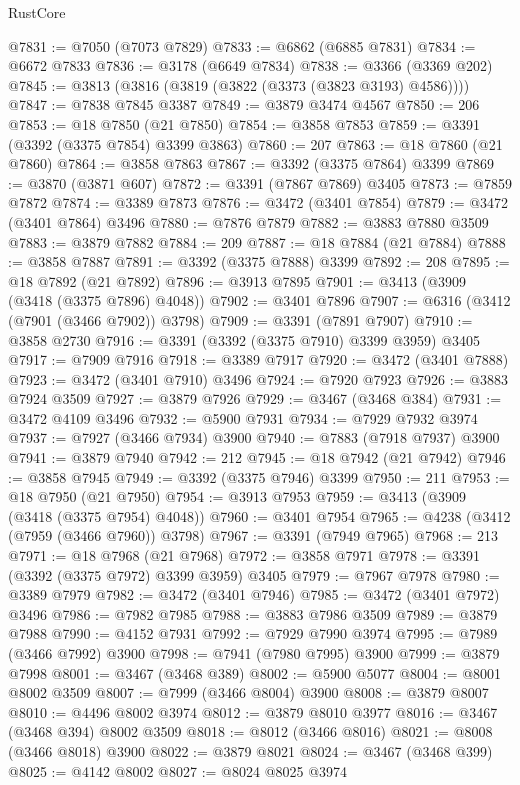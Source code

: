 \begin{lexlean}{RustCore}
\begin{coremodule}
@7831 := @7050 (@7073 @7829)
@7833 := @6862 (@6885 @7831)
@7834 := @6672 @7833
@7836 := @3178 (@6649 @7834)
@7838 := @3366 (@3369 @202)
@7845 := @3813 (@3816 (@3819 (@3822 (@3373 (@3823 @3193) @4586))))
@7847 := @7838 @7845 @3387
@7849 := @3879 @3474 @4567
@7850 := 206
@7853 := @18 @7850 (@21 @7850)
@7854 := @3858 @7853
@7859 := @3391 (@3392 (@3375 @7854) @3399 @3863)
@7860 := 207
@7863 := @18 @7860 (@21 @7860)
@7864 := @3858 @7863
@7867 := @3392 (@3375 @7864) @3399
@7869 := @3870 (@3871 @607)
@7872 := @3391 (@7867 @7869) @3405
@7873 := @7859 @7872
@7874 := @3389 @7873
@7876 := @3472 (@3401 @7854)
@7879 := @3472 (@3401 @7864) @3496
@7880 := @7876 @7879
@7882 := @3883 @7880 @3509
@7883 := @3879 @7882
@7884 := 209
@7887 := @18 @7884 (@21 @7884)
@7888 := @3858 @7887
@7891 := @3392 (@3375 @7888) @3399
@7892 := 208
@7895 := @18 @7892 (@21 @7892)
@7896 := @3913 @7895
@7901 := @3413 (@3909 (@3418 (@3375 @7896) @4048))
@7902 := @3401 @7896
@7907 := @6316 (@3412 (@7901 (@3466 @7902)) @3798)
@7909 := @3391 (@7891 @7907)
@7910 := @3858 @2730
@7916 := @3391 (@3392 (@3375 @7910) @3399 @3959) @3405
@7917 := @7909 @7916
@7918 := @3389 @7917
@7920 := @3472 (@3401 @7888)
@7923 := @3472 (@3401 @7910) @3496
@7924 := @7920 @7923
@7926 := @3883 @7924 @3509
@7927 := @3879 @7926
@7929 := @3467 (@3468 @384)
@7931 := @3472 @4109 @3496
@7932 := @5900 @7931
@7934 := @7929 @7932 @3974
@7937 := @7927 (@3466 @7934) @3900
@7940 := @7883 (@7918 @7937) @3900
@7941 := @3879 @7940
@7942 := 212
@7945 := @18 @7942 (@21 @7942)
@7946 := @3858 @7945
@7949 := @3392 (@3375 @7946) @3399
@7950 := 211
@7953 := @18 @7950 (@21 @7950)
@7954 := @3913 @7953
@7959 := @3413 (@3909 (@3418 (@3375 @7954) @4048))
@7960 := @3401 @7954
@7965 := @4238 (@3412 (@7959 (@3466 @7960)) @3798)
@7967 := @3391 (@7949 @7965)
@7968 := 213
@7971 := @18 @7968 (@21 @7968)
@7972 := @3858 @7971
@7978 := @3391 (@3392 (@3375 @7972) @3399 @3959) @3405
@7979 := @7967 @7978
@7980 := @3389 @7979
@7982 := @3472 (@3401 @7946)
@7985 := @3472 (@3401 @7972) @3496
@7986 := @7982 @7985
@7988 := @3883 @7986 @3509
@7989 := @3879 @7988
@7990 := @4152 @7931
@7992 := @7929 @7990 @3974
@7995 := @7989 (@3466 @7992) @3900
@7998 := @7941 (@7980 @7995) @3900
@7999 := @3879 @7998
@8001 := @3467 (@3468 @389)
@8002 := @5900 @5077
@8004 := @8001 @8002 @3509
@8007 := @7999 (@3466 @8004) @3900
@8008 := @3879 @8007
@8010 := @4496 @8002 @3974
@8012 := @3879 @8010 @3977
@8016 := @3467 (@3468 @394) @8002 @3509
@8018 := @8012 (@3466 @8016)
@8021 := @8008 (@3466 @8018) @3900
@8022 := @3879 @8021
@8024 := @3467 (@3468 @399)
@8025 := @4142 @8002
@8027 := @8024 @8025 @3974

\end{coremodule}
\end{lexlean}
